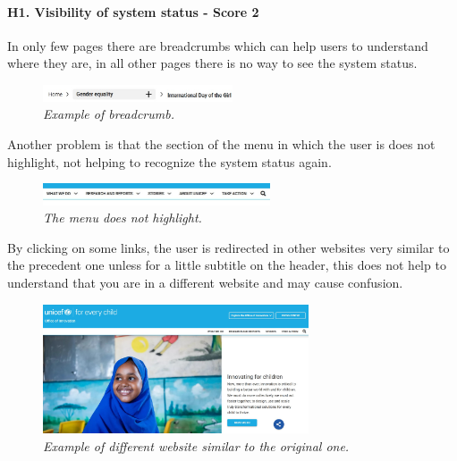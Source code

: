\paragraph{H1. Visibility of system status - Score 2} \label{subsec:H1}	In only few pages there are breadcrumbs which can help users to understand where they are, in all other pages there is no way to see the system status.
\begin{figure}[!h]
	\begin{center}
		\includegraphics[width=0.5\textwidth]{FinalScores1.jpg}
		\captionsetup{font=small}
		\caption{\textit{Example of breadcrumb.}}
	\end{center}
\end{figure}
\newline Another problem is that the section of the menu in which the user is does not highlight, not helping to recognize the system status again.
\begin{figure}[!h]
	\begin{center}
		\includegraphics[width=0.6\textwidth]{FinalScores2.jpg}
		\captionsetup{font=small}
		\caption{\textit{The menu does not highlight.}}
	\end{center}
\end{figure}
\newline By clicking on some links, the user is redirected in other websites very similar to the precedent one unless for a little subtitle on the header, this does not help to understand that you are in a different website and may cause confusion.
\begin{figure}[!h]
	\begin{center}
		\includegraphics[width=0.7\textwidth]{FinalScores3.jpg}
		\captionsetup{font=small}
		\caption{\textit{Example of different website similar to the original one.}}
	\end{center}
\end{figure}
\newline
